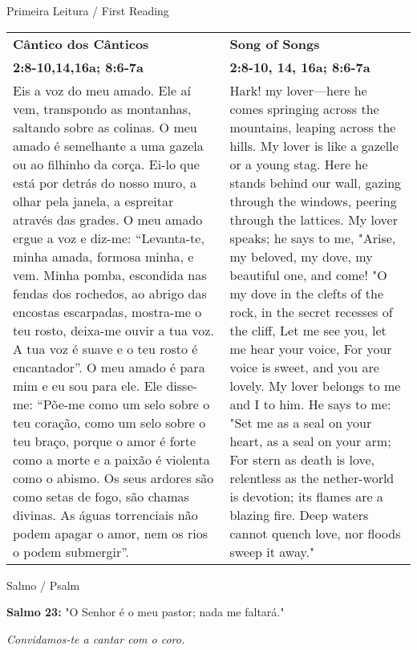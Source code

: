 \newpage
{\large Primeira Leitura / First Reading}

\begin{longtable}{p{2in}p{2in}}

  {\bf Cântico dos Cânticos} & \hfill{\bf Song of Songs}\\
  {\bf 2:8-10,14,16a; 8:6-7a} &  \hfill{\bf 2:8-10, 14, 16a; 8:6-7a}\\

Eis a voz do meu amado. Ele aí vem, transpondo as montanhas, saltando sobre as colinas. O meu amado é semelhante a uma gazela ou ao filhinho da corça. Ei-lo que está por detrás do nosso muro, a olhar pela janela, a espreitar através das grades.
O meu amado ergue a voz e diz-me: “Levanta-te, minha amada, formosa minha, e vem. Minha pomba, escondida nas fendas dos rochedos, ao abrigo das encostas escarpadas, mostra-me o teu rosto, deixa-me ouvir a tua voz. A tua voz é suave e o teu rosto é encantador”.
O meu amado é para mim e eu sou para ele.
Ele disse-me: “Põe-me como um selo sobre o teu coração, como um selo sobre o teu braço, porque o amor é forte como a morte e a paixão é violenta como o abismo. Os seus ardores são como setas de fogo, são chamas divinas. As águas torrenciais não podem apagar o amor, nem os rios o podem submergir”.

&
  
  
Hark! my lover—here he comes springing across the
mountains, leaping across the hills.
My lover is like a gazelle or a young stag.
Here he stands behind our wall, gazing through the windows,
peering through the lattices.
My lover speaks; he says to me,
"Arise, my beloved, my dove, my beautiful one, and come!
"O my dove in the clefts of the rock, in the secret
recesses of the cliff,
Let me see you, let me hear your voice,
For your voice is sweet, and you are lovely.
My lover belongs to me and I to him.
He says to me:
"Set me as a seal on your heart, as a seal on your arm;
For stern as death is love, relentless as the nether-world is
devotion; its flames are a blazing fire. Deep waters cannot
quench love, nor floods sweep it away."

\end{longtable}


{\large Salmo / Psalm}


{\bf Salmo 23:} "O Senhor é o meu pastor; nada me faltará." 

{\it Convidamos-te a cantar com o coro.}

\vspace{10pt}

